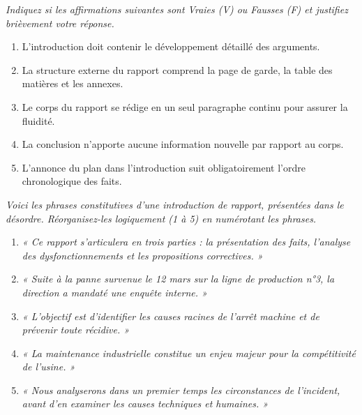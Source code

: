 \documentclass[11pt]{article}
\begin{document}
\begin{exercice}
\emph{Indiquez si les affirmations suivantes sont Vraies (V) ou Fausses (F) et justifiez brièvement votre réponse.}
\begin{enumerate}
    \item L'introduction doit contenir le développement détaillé des arguments.
    \item La structure externe du rapport comprend la page de garde, la table des matières et les annexes.
    \item Le corps du rapport se rédige en un seul paragraphe continu pour assurer la fluidité.
    \item La conclusion n'apporte aucune information nouvelle par rapport au corps.
    \item L'annonce du plan dans l'introduction suit obligatoirement l'ordre chronologique des faits.
\end{enumerate}
\end{exercice}

\begin{exercice}
\emph{Voici les phrases constitutives d'une introduction de rapport, présentées dans le désordre. Réorganisez-les logiquement (1 à 5) en numérotant les phrases.}
\begin{enumerate}
    \item \emph{« Ce rapport s'articulera en trois parties : la présentation des faits, l'analyse des dysfonctionnements et les propositions correctives. »}
    \item \emph{« Suite à la panne survenue le 12 mars sur la ligne de production n°3, la direction a mandaté une enquête interne. »}
    \item \emph{« L'objectif est d'identifier les causes racines de l'arrêt machine et de prévenir toute récidive. »}
    \item \emph{« La maintenance industrielle constitue un enjeu majeur pour la compétitivité de l'usine. »}
    \item \emph{« Nous analyserons dans un premier temps les circonstances de l'incident, avant d'en examiner les causes techniques et humaines. »}
\end{enumerate}
\end{exercice}
\end{document}
